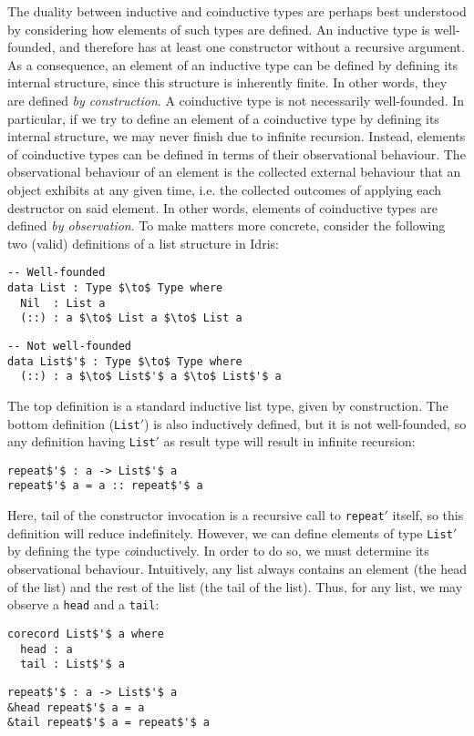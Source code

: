 The duality between inductive and coinductive types are perhaps best understood
by considering how elements of such types are defined. An inductive type is
well-founded, and therefore has at least one constructor without a recursive
argument. As a consequence, an element of an inductive type can be defined by
defining its internal structure, since this structure is inherently finite. In
other words, they are defined \emph{by construction}. A coinductive type is not
necessarily well-founded. In particular, if we try to define an element of a
coinductive type by defining its internal structure, we may never finish due to
infinite recursion. Instead, elements of coinductive types can be defined in
terms of their observational behaviour. The observational behaviour of an
element is the collected external behaviour that an object exhibits at any given
time, i.e. the collected outcomes of applying each destructor on said
element. In other words, elements of coinductive types are defined \emph{by
  observation}. To make matters more concrete, consider the following two (valid)
definitions of a list structure in Idris:
\begin{lstlisting}[mathescape,title=\idrisBlock]
-- Well-founded
data List : Type $\to$ Type where
  Nil  : List a
  (::) : a $\to$ List a $\to$ List a
\end{lstlisting}
\begin{lstlisting}[mathescape,title=\idrisBlock]
-- Not well-founded
data List$'$ : Type $\to$ Type where
  (::) : a $\to$ List$'$ a $\to$ List$'$ a
\end{lstlisting}
The top definition is a standard inductive list type, given by construction. The
bottom definition (\texttt{List$'$}) is also inductively defined, but it is not well-founded, so any definition
having \texttt{List$'$} as result type will result in infinite
recursion:
\begin{lstlisting}[mathescape,title=\idrisBlock]
repeat$'$ : a -> List$'$ a
repeat$'$ a = a :: repeat$'$ a
\end{lstlisting}
Here, tail of the constructor invocation is a recursive call to
\texttt{repeat$'$} itself, so this definition will reduce indefinitely.
However, we can define elements of type \texttt{List$'$} by defining the type
\emph{co}inductively. In order to do so, we must determine its observational
behaviour. Intuitively, any list always contains an element (the head of the
list) and the rest of the list (the tail of the list). Thus, for any list, we
may observe a \texttt{head} and a \texttt{tail}:
\begin{lstlisting}[mathescape,title=\idrisBlock]
corecord List$'$ a where
  head : a
  tail : List$'$ a
\end{lstlisting}
\begin{lstlisting}[mathescape,title=\idrisBlock]
repeat$'$ : a -> List$'$ a
&head repeat$'$ a = a 
&tail repeat$'$ a = repeat$'$ a
\end{lstlisting}


